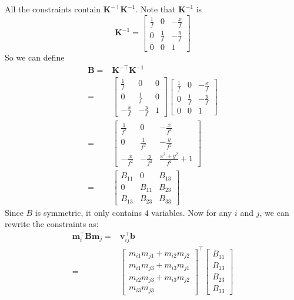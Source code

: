 \documentclass[10pt,twocolumn,letterpaper]{article}
\begin{document}
All the constraints contain $\mathbf{K}^{-\top}\mathbf{K}^{-1}$. Note that $\mathbf{K}^{-1}$ is
\begin{equation}
\mathbf{K}^{-1}=\left [
\begin{array}{ccc}
\frac{1}{f} & 0 & -\frac{x}{f} \\
0 & \frac{1}{f} & -\frac{y}{f} \\
0 & 0 & 1
\end{array}
\right ]
\end{equation}
So we can define
\begin{equation}
\begin{split}
\mathbf{B}=&\mathbf{K}^{-\top}\mathbf{K}^{-1}\\
=&\left [
\begin{array}{ccc}
\frac{1}{f} & 0 & 0 \\
0 & \frac{1}{f} & 0 \\
-\frac{x}{f} & -\frac{y}{f} & 1
\end{array}
\right ]
\left [
\begin{array}{ccc}
\frac{1}{f} & 0 & -\frac{x}{f} \\
0 & \frac{1}{f} & -\frac{y}{f} \\
0 & 0 & 1
\end{array}
\right ]\\
=&\left [
\begin{array}{ccc}
\frac{1}{f^2} & 0 & -\frac{x}{f^2} \\
0 & \frac{1}{f^2} & -\frac{y}{f^2} \\
-\frac{x}{f^2} & -\frac{y}{f^2} & \frac{x^2+y^2}{f^2} + 1
\end{array}
\right ]\\
=&\left [
\begin{array}{ccc}
B_{11} & 0 & B_{13} \\
0 & B_{11} & B_{23} \\
B_{13} & B_{23} & B_{33}
\end{array}
\right ]
\end{split}
\end{equation}
Since $B$ is symmetric, it only contains $4$ variables. Now for any $i$ and $j$, we can rewrite the constraints as:
\begin{equation}
\begin{split}
\mathbf{m}_i^\top\mathbf{B}\mathbf{m}_j=&\mathbf{v}_{ij}^\top\mathbf{b}\\
=&\left [
\begin{array}{c}
m_{i1}m_{j1}+m_{i2}m_{j2}\\
m_{i1}m_{j3}+m_{i3}m_{j1}\\
m_{i2}m_{j3}+m_{i3}m_{j2}\\
m_{i3}m_{j3}
\end{array}
\right ]^\top
\left [
\begin{array}{c}
B_{11} \\
B_{13} \\
B_{23} \\
B_{33}
\end{array}
\right ]\\
\end{split}
\end{equation}
\end{document}
